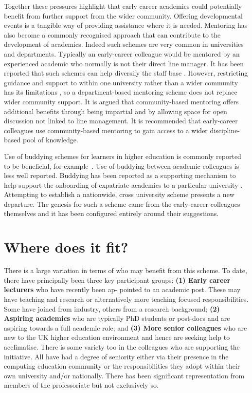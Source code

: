 \documentclass[sigconf]{acmart}
\begin{document}
Together these pressures highlight that early career academics could
potentially benefit from further support from the wider
community. Offering developmental events is a tangible way of
providing assistance where it is needed. Mentoring has also become a
commonly recognised approach that can contribute to the development of
academics. Indeed such schemes are very common in universities and
departments. Typically an early-career colleague would be mentored by
an experienced academic who normally is not their direct line
manager. It has been reported that such schemes can help diversify the
staff base \cite{Golubchik2018}. However, restricting guidance and
support to within one university rather than a wider community has its
limitations \cite{Golubchik2018}, so a department-based mentoring
scheme does not replace wider community support.  It is argued that
community-based mentoring offers additional benefits through being
impartial and by allowing space for open discussion not linked to line
management. It is recommended that early-career colleagues use
community-based mentoring to gain access to a wider discipline-based
pool of knowledge.

Use of buddying schemes for learners in higher education is commonly
reported to be beneficial, for example~\cite{Hayes2020,May20}. Use of
buddying between academic colleagues is less well reported. Buddying
has been reported as a supporting mechanism to help support the
onboarding of expatriate academics to a particular university
\cite{Wilkins2019}. Attempting to establish a nationwide, cross
university scheme presents a new departure. The genesis for such a
scheme came from the early-career colleagues themselves and it has
been configured entirely around their suggestions.
	
\section{Where does it fit?}

There is a large variation in terms of who may benefit from this
scheme. To date, there have principally been three key participant
groups: \textbf{(1) Early career lecturers} who have recently been ap-
pointed to an academic post. These may have teaching and research or
alternatively more teaching focused responsibilities. Some have joined
from industry, others from a research background; \textbf{(2) Aspiring
academics }who are typically PhD students or post-docs and are
aspiring towards a full academic role; and \textbf{ (3) More senior
colleagues} who are new to the UK higher education environment and
hence are seeking help to acclimatise. There is some variety too in
the colleagues who are supporting the initiative. All have had a
degree of seniority either via their presence in the computing
education community or the responsibilities they adopt within their
own university and/or nationally. There has been significant
representation from members of the professoriate but not exclusively
so.
\end{document}

